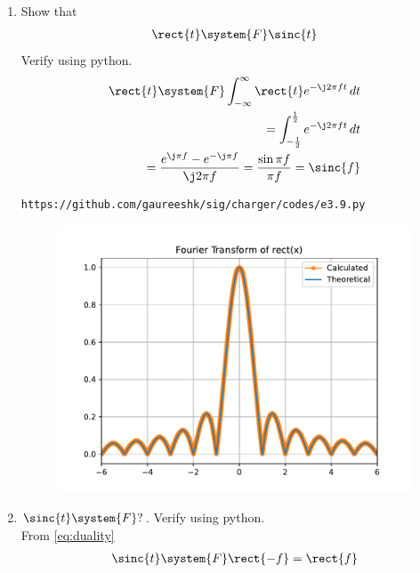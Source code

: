 \documentclass[journal,12pt,twocolumn]{IEEEtran}
\renewcommand\thesection{\arabic{section}}
\begin{document}
\begin{enumerate}[label=\thesection.\arabic*
,ref=\thesection.\theenumi]
\begin{figure}[!ht]
\begin{center}
	\end{center}
	\label{fig:}	
\end{figure}
\vspace{4cm}
 \item Show that 
 \begin{align}
	 \rect{t} \system{F} \sinc{t}
 \end{align}
 Verify using python.\\
\solution 
\begin{align}
	\rect{t}\system{F}\int_{-\infty}^{\infty}\rect{t}e^{-\j2\pi ft}\, dt \\
	=\int_{-\frac{1}{2}}^{\frac{1}{2}}e^{-\j2\pi ft}\, dt \\
	=\frac{e^{\j\pi f} - e^{-\j\pi f}}{\j2\pi f} = \frac{\sin{\pi f}}{\pi f} = \sinc{f}
	\label{eq:fourier-rect}
\end{align}		
\begin{lstlisting}
https://github.com/gaureeshk/sig/charger/codes/e3.9.py
\end{lstlisting}
\begin{figure}[!ht]
	\begin{center}
		\includegraphics[width=\columnwidth]{./figs/e3.9.pdf}
	\end{center}
	\label{fig:}	
\end{figure}
 \item 
$	 \sinc{t}\system{F} ?$.  Verify using python.\\
\solution From \eqref{eq:duality}
\begin{align}
	\sinc{t}\system{F}\rect{-f}=\rect{f}
	\label{eq:fourier-sinc}

\end{align}
\end{enumerate}
\end{document}
